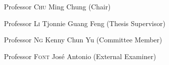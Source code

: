 
\begin{committee}
\vspace{0.9cm}
    \Large
	\textrm{Professor \textsc{Chu} Ming Chung (Chair)}

\vspace{0.4cm}

    \textrm{Professor \textsc{Li} Tjonnie Guang Feng (Thesis Supervisor)}

\vspace{0.4cm}

	\textrm{Professor \textsc{Ng} Kenny Chun Yu (Committee Member)}

\vspace{0.4cm}

    \textrm{Professor \textsc{Font} José Antonio (External Examiner)}

\end{committee}
